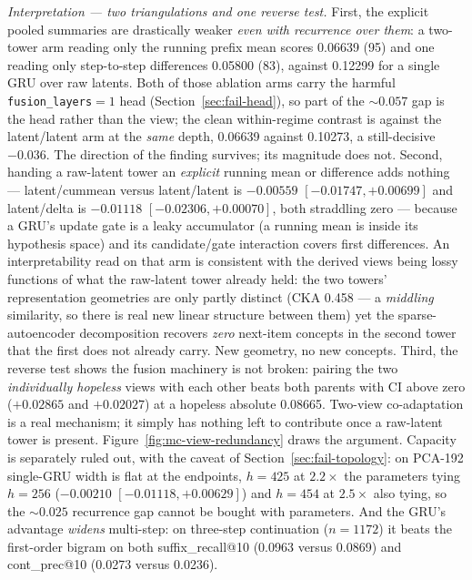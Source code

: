\documentclass[11pt]{article}
\begin{document}
\emph{Interpretation --- two triangulations and one reverse test.} First, the
explicit pooled summaries are drastically weaker \emph{even with recurrence over
them}: a two-tower arm reading only the running prefix mean scores \num{0.06639}
(\num{95}) and one reading only step-to-step differences \num{0.05800}
(\num{83}), against \num{0.12299} for a single GRU over raw latents. Both of
those ablation arms carry the harmful \texttt{fusion\_layers}${}=1$ head
(Section~\ref{sec:fail-head}), so part of the ${\sim}\num{0.057}$ gap is the head
rather than the view; the clean within-regime contrast is against the
latent/latent arm at the \emph{same} depth, \num{0.06639} against \num{0.10273},
a still-decisive $-\num{0.036}$. The direction of the finding survives; its
magnitude does not. Second,
handing a raw-latent tower an \emph{explicit} running mean or difference adds
nothing --- latent/cummean versus latent/latent is $-\num{0.00559}$
$[-\num{0.01747},+\num{0.00699}]$ and latent/delta is $-\num{0.01118}$
$[-\num{0.02306},+\num{0.00070}]$, both straddling zero --- because a GRU's
update gate is a leaky accumulator (a running mean is inside its hypothesis
space) and its candidate/gate interaction covers first differences. An
interpretability read on that arm is consistent with the derived views being
lossy functions of what the raw-latent tower already held: the two towers'
representation geometries are only partly distinct (CKA \num{0.458} --- a
\emph{middling} similarity, so there is real new linear structure between them)
yet the sparse-autoencoder decomposition recovers \emph{zero} next-item concepts
in the second tower that the first does not already carry. New geometry, no new
concepts. Third, the reverse test shows the fusion
machinery is not broken: pairing the two \emph{individually hopeless} views with
each other beats both parents with CI above zero ($+\num{0.02865}$ and
$+\num{0.02027}$) at a hopeless absolute \num{0.08665}. Two-view co-adaptation
is a real mechanism; it simply has nothing left to contribute once a raw-latent
tower is present. Figure~\ref{fig:mc-view-redundancy} draws the argument.
Capacity is separately ruled out, with the caveat of
Section~\ref{sec:fail-topology}: on PCA-192 single-GRU width is flat at the
endpoints, $h=425$ at $2.2\times$ the parameters tying $h=256$ ($-\num{0.00210}$
$[-\num{0.01118},+\num{0.00629}]$) and $h=454$ at $2.5\times$ also tying, so the
${\sim}\num{0.025}$ recurrence gap cannot be bought with parameters. And the
GRU's advantage \emph{widens} multi-step: on three-step continuation
($n=\num{1172}$) it beats the first-order bigram on both suffix\_recall@10
(\num{0.0963} versus \num{0.0869}) and cont\_prec@10 (\num{0.0273} versus
\num{0.0236}).
\end{document}
